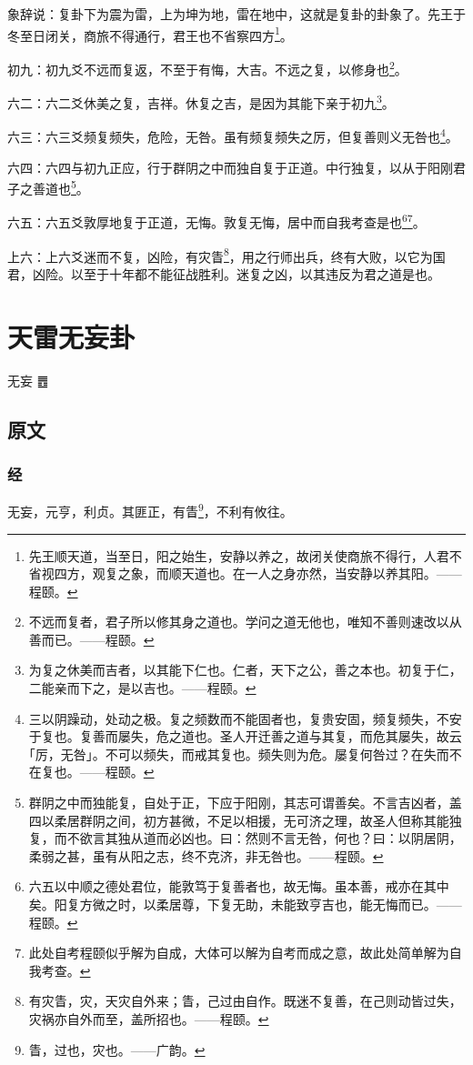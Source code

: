 \documentclass[12pt,oneside]{book}
\begin{document}
象辞说：复卦下为震为雷，上为坤为地，雷在地中，这就是复卦的卦象了。先王于冬至日闭关，商旅不得通行，君王也不省察四方\footnote{先王顺天道，当至日，阳之始生，安静以养之，故闭关使商旅不得行，人君不省视四方，观复之象，而顺天道也。在一人之身亦然，当安静以养其阳。——程颐。}。

初九：初九爻不远而复返，不至于有悔，大吉。不远之复，以修身也\footnote{不远而复者，君子所以修其身之道也。学问之道无他也，唯知不善则速改以从善而已。——程颐。}。

六二：六二爻休美之复，吉祥。休复之吉，是因为其能下亲于初九\footnote{为复之休美而吉者，以其能下仁也。仁者，天下之公，善之本也。初复于仁，二能亲而下之，是以吉也。——程颐。}。

六三：六三爻频复频失，危险，无咎。虽有频复频失之厉，但复善则义无咎也\footnote{三以阴躁动，处动之极。复之频数而不能固者也，复贵安固，频复频失，不安于复也。复善而屡失，危之道也。圣人开迁善之道与其复，而危其屡失，故云｢厉，无咎｣。不可以频失，而戒其复也。频失则为危。屡复何咎过？在失而不在复也。——程颐。}。

六四：六四与初九正应，行于群阴之中而独自复于正道。中行独复，以从于阳刚君子之善道也\footnote{群阴之中而独能复，自处于正，下应于阳刚，其志可谓善矣。不言吉凶者，盖四以柔居群阴之间，初方甚微，不足以相援，无可济之理，故圣人但称其能独复，而不欲言其独从道而必凶也。曰：然则不言无咎，何也？曰：以阴居阴，柔弱之甚，虽有从阳之志，终不克济，非无咎也。——程颐。}。

六五：六五爻敦厚地复于正道，无悔。敦复无悔，居中而自我考查是也\footnote{六五以中顺之德处君位，能敦笃于复善者也，故无悔。虽本善，戒亦在其中矣。阳复方微之时，以柔居尊，下复无助，未能致亨吉也，能无悔而已。——程颐。}\footnote{此处自考程颐似乎解为自成，大体可以解为自考而成之意，故此处简单解为自我考查。}。

上六：上六爻迷而不复，凶险，有灾眚\footnote{有灾眚，灾，天灾自外来；眚，己过由自作。既迷不复善，在己则动皆过失，灾祸亦自外而至，盖所招也。——程颐。}，用之行师出兵，终有大败，以它为国君，凶险。以至于十年都不能征战胜利。迷复之凶，以其违反为君之道是也。


\chapter{天雷无妄卦}
无妄 {\Large ䷘}

\section{原文}
\subsection{经}
无妄，元亨，利贞。其匪正，有眚\footnote{眚，过也，灾也。——广韵。}，不利有攸往。
\end{document}
